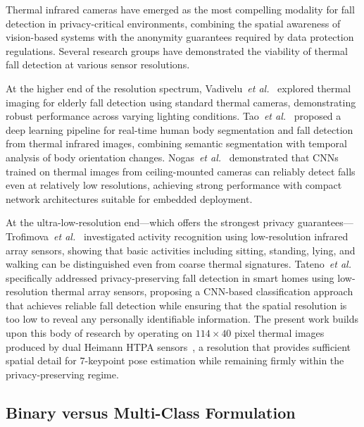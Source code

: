 Thermal infrared cameras have emerged as the most compelling modality for fall detection in privacy-critical environments, combining the spatial awareness of vision-based systems with the anonymity guarantees required by data protection regulations. Several research groups have demonstrated the viability of thermal fall detection at various sensor resolutions.

At the higher end of the resolution spectrum, Vadivelu~\emph{et al.}~\cite{vadivelu2016thermal} explored thermal imaging for elderly fall detection using standard thermal cameras, demonstrating robust performance across varying lighting conditions. Tao~\emph{et al.}~\cite{tao2018real} proposed a deep learning pipeline for real-time human body segmentation and fall detection from thermal infrared images, combining semantic segmentation with temporal analysis of body orientation changes. Nogas~\emph{et al.}~\cite{nogas2020fall} demonstrated that CNNs trained on thermal images from ceiling-mounted cameras can reliably detect falls even at relatively low resolutions, achieving strong performance with compact network architectures suitable for embedded deployment.

At the ultra-low-resolution end---which offers the strongest privacy guarantees---Trofimova~\emph{et al.}~\cite{trofimova2017indoor} investigated activity recognition using low-resolution infrared array sensors, showing that basic activities including sitting, standing, lying, and walking can be distinguished even from coarse thermal signatures. Tateno~\emph{et al.}~\cite{tateno2020privacy} specifically addressed privacy-preserving fall detection in smart homes using low-resolution thermal array sensors, proposing a CNN-based classification approach that achieves reliable fall detection while ensuring that the spatial resolution is too low to reveal any personally identifiable information. The present work builds upon this body of research by operating on $114 \times 40$ pixel thermal images produced by dual Heimann HTPA sensors~\cite{heimann2024htpa}, a resolution that provides sufficient spatial detail for 7-keypoint pose estimation while remaining firmly within the privacy-preserving regime.

\subsection*{Binary versus Multi-Class Formulation}

